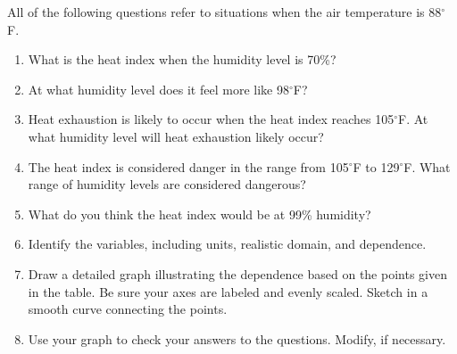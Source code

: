 \begin{enumerate}
All of the following questions refer to situations when the air temperature is 88$^\circ$F.
\begin{enumerate}
\item What is the heat index when the humidity level is 70\%?
\item At what humidity level does it feel more like 98$^\circ$F?
\item Heat exhaustion is likely to occur when the heat index reaches 105$^\circ$F.  At what humidity level will heat exhaustion likely occur?
\item The heat index is considered danger in the range from 105$^\circ$F to 129$^\circ$F.  What range of humidity levels are considered dangerous?
\item What do you think the heat index would be at 99\% humidity?
\item Identify the variables, including units, realistic domain, and dependence.
\item Draw a detailed graph illustrating the dependence based on the points given in the table.  Be sure your axes are labeled and evenly scaled.  Sketch in a smooth curve connecting the points.
\item Use your graph to check your answers to the questions.  Modify, if necessary.
\end{enumerate}
 
\end{enumerate}



